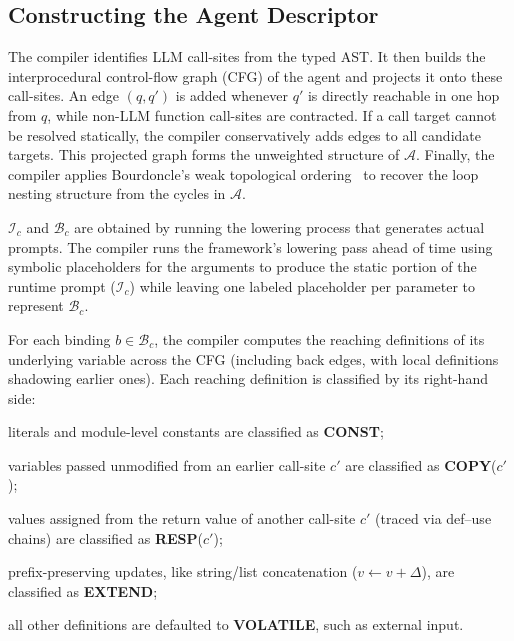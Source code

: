 \subsection{Constructing the Agent Descriptor}
\label{sec:analysis}

The compiler identifies LLM call-sites from the typed AST. It then builds the interprocedural control-flow graph (CFG) of the agent and projects it onto these call-sites. An edge $(q, q')$ is added whenever $q'$ is directly reachable in one hop from $q$, while non-LLM function call-sites are contracted. If a call target cannot be resolved statically, the compiler conservatively adds edges to all candidate targets. This projected graph forms the unweighted structure of $\mathcal{A}$. Finally, the compiler applies Bourdoncle's weak topological ordering~\cite{bourdoncle1993efficient} to recover the loop nesting structure from the cycles in $\mathcal{A}$.

$\mathcal{I}_c$ and $\mathcal{B}_c$ are obtained by running the lowering process that generates actual prompts. The compiler runs the framework's lowering pass ahead of time using symbolic placeholders for the arguments to produce the static portion of the runtime prompt ($\mathcal{I}_c$) while leaving one labeled placeholder per parameter to represent $\mathcal{B}_c$.

For each binding $b \in \mathcal{B}_c$, the compiler computes the reaching definitions of its underlying variable across the CFG (including back edges, with local definitions shadowing earlier ones). Each reaching definition is classified by its right-hand side:
\begin{enumerate*}[label=(\roman*)]
    \item literals and module-level constants are classified as \textbf{CONST};
    \item variables passed unmodified from an earlier call-site $c'$ are classified as \textbf{COPY}($c'$);
    \item values assigned from the return value of another call-site $c'$ (traced via def--use chains) are classified as \textbf{RESP}($c'$);
    \item prefix-preserving updates, like string/list concatenation ($v \leftarrow v + \Delta$), are classified as \textbf{EXTEND};
    \item all other definitions are defaulted to \textbf{VOLATILE}, such as external input.
\end{enumerate*}

